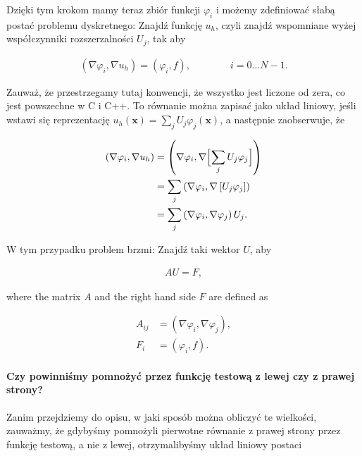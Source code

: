 \documentclass[]{pracamgr}
\begin{document}
      Dzięki tym krokom mamy teraz zbiór funkcji $\varphi_i$ i możemy zdefiniować słabą postać problemu dyskretnego: Znajdź funkcję $u_h$, czyli znajdź wspomniane wyżej współczynniki rozszerzalności $U_j$, tak aby

      \begin{align*}
        (\nabla\varphi_i, \nabla u_h)
         = (\varphi_i, f),
         \qquad\qquad
         i=0\ldots N-1.
      \end{align*}

      Zauważ, że przestrzegamy tutaj konwencji, że wszystko jest liczone od zera, co jest powszechne w C i C++. To równanie można zapisać jako układ liniowy, jeśli wstawi się reprezentację $u_h(\mathbf x)=\sum_j U_j \varphi_j(\mathbf x)$, a następnie zaobserwuje, że

      \begin{align*}
        (\nabla\varphi_i, \nabla u_h)
        &= \left(\nabla\varphi_i, \nabla \Bigl[\sum_j U_j \varphi_j\Bigr]\right)
        \\
        &= \sum_j \left(\nabla\varphi_i, \nabla \left[U_j \varphi_j\right]\right)
        \\
        &= \sum_j \left(\nabla\varphi_i, \nabla \varphi_j \right) U_j.
      \end{align*}

      W tym przypadku problem brzmi: Znajdź taki wektor $U$, aby
      
      \begin{align*}
        A U = F,
      \end{align*}

      where the matrix $A$ and the right hand side $F$ are defined as

      \begin{align*}
        A_{ij} &= (\nabla\varphi_i, \nabla \varphi_j),
        \\
        F_i &= (\varphi_i, f).
      \end{align*}

      \paragraph{Czy powinniśmy pomnożyć przez funkcję testową z lewej czy z prawej strony?}

        Zanim przejdziemy do opisu, w jaki sposób można obliczyć te wielkości, zauważmy, że gdybyśmy pomnożyli pierwotne równanie z prawej strony przez funkcję testową, a nie z lewej, otrzymalibyśmy układ liniowy postaci
\end{document}
